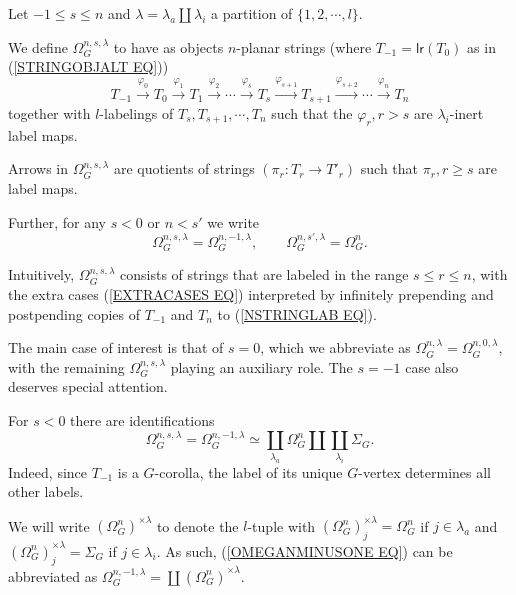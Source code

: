 \documentclass[a4paper,10pt]{article}%
\begin{document}
\begin{definition}
Let $-1 \leq s \leq n$ and 
$\lambda = \lambda_a \amalg \lambda_i$
a partition of $\{1,2,\cdots,l\}$.

We define $\Omega_{G}^{n,s,\lambda}$ to have as objects $n$-planar strings (where $T_{-1} = \mathsf{lr}(T_0)$ as in (\ref{STRINGOBJALT EQ}))
\begin{equation}\label{NSTRINGLAB EQ}
	T_{-1} \xrightarrow{\varphi_0}
	T_0 \xrightarrow{\varphi_1}
	T_1 \xrightarrow{\varphi_2}
	\cdots \xrightarrow{\varphi_s}
	T_s \xrightarrow{\varphi_{s+1}}
	T_{s+1} \xrightarrow{\varphi_{s+2}}
	\cdots \xrightarrow{\varphi_n}
	T_{n}
\end{equation}
together with
$l$-labelings of $T_s, T_{s+1},\cdots, T_{n}$ such that the $\varphi_r,r>s$ are $\lambda_i$-inert label maps.

Arrows in $\Omega_{G}^{n,s,\lambda}$ are quotients of strings
$(\pi_r \colon T_r \to T'_r)$ such that 
$\pi_r, r\geq s$ are label maps.

Further, for any $s<0$ or $n<s'$ we write
\begin{equation}\label{EXTRACASES EQ}
	\Omega_{G}^{n,s,\lambda} = 
		\Omega_{G}^{n,-1,\lambda},
\qquad
	\Omega_{G}^{n,s',\lambda} = \Omega_{G}^{n}.
\end{equation}
\end{definition}

Intuitively, $\Omega_G^{n,s,\lambda}$ consists of strings that are labeled in the range $s \leq r \leq n$,
with the extra cases (\ref{EXTRACASES EQ}) interpreted by infinitely prepending and postpending copies of $T_{-1}$ and $T_n$ to (\ref{NSTRINGLAB EQ}).

The main case of interest is that of $s=0$, which we abbreviate as $\Omega_{G}^{n,\lambda} = \Omega_{G}^{n,0,\lambda}$,
with the remaining
$\Omega_{G}^{n,s,\lambda}$ playing an auxiliary role.
The $s=-1$ case also deserves special attention.

\begin{remark}
	For $s<0$ there are identifications 
\begin{equation}\label{OMEGANMINUSONE EQ}
	\Omega_{G}^{n,s,\lambda} = 
	\Omega_{G}^{n,-1,\lambda} \simeq
		\coprod_{\lambda_a} \Omega_{G}^{n} \amalg
		\coprod_{\lambda_i} \Sigma_G.
\end{equation}
Indeed, since $T_{-1}$ is a $G$-corolla, the label of its unique $G$-vertex determines all other labels.
\end{remark}

\begin{notation}
We will write $(\Omega_G^n)^{\times \lambda}$ to denote the $l$-tuple with 
$(\Omega_G^n)^{\times \lambda}_j = \Omega_G^n$ if 
$j \in \lambda_a$ and
$(\Omega_G^n)^{\times \lambda}_j = \Sigma_G$ if
$j \in \lambda_i$.
As such, (\ref{OMEGANMINUSONE EQ}) can be abbreviated as
$\Omega_{G}^{n,-1,\lambda} = \coprod (\Omega_G^n)^{\times \lambda}$.
\end{notation}
\end{document}
